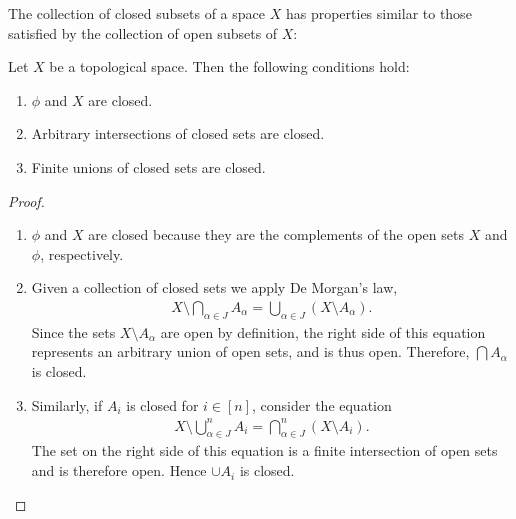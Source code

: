 \documentclass[a4paper,english,12pt]{article}
\begin{document}
The collection of closed subsets of a space $X$ has properties similar to those satisfied by the collection of open subsets of $X$:

\begin{thm}
	Let $X$ be a topological space. Then the following conditions hold:
	\begin{enumerate}
		\item $\phi$ and $X$ are closed.
		\item Arbitrary intersections of closed sets are closed.
		\item Finite unions of closed sets are closed.
	\end{enumerate}
\end{thm}

\begin{proof}
	\begin{enumerate}
		\item $\phi$ and $X$ are closed because they are the complements of the open sets $X$ and $\phi$, respectively.
		
		\item Given a collection of closed sets we apply De Morgan's law,
		\begin{align*}
			X \setminus\bigcap_{\alpha \in J} A_\alpha = \bigcup_{\alpha \in J} (X \setminus A_\alpha).
		\end{align*}
		Since the sets $X \setminus A_\alpha$ are open by definition, the right side of this equation represents	an arbitrary union of open sets, and is thus open. Therefore, $\bigcap A_\alpha$ is closed.
		
		\item Similarly, if $A_i$ is closed for $i \in [n]$, consider the equation
		\begin{align*}
			X \setminus\bigcup_{\alpha \in J}^n A_i = \bigcap_{\alpha \in J}^n (X \setminus A_i).
		\end{align*}
		The set on the right side of this equation is a finite intersection of open sets and is therefore open. Hence $\cup A_i$ is closed.
	\end{enumerate}
\end{proof}
	
	
\end{document}
